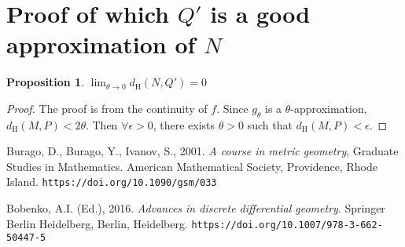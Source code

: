 \documentclass{article}
\newtheorem{proposition}{Proposition}
\begin{document}
\section{Proof of which $Q'$ is a good approximation of $N$}

\begin{proposition}
  $\lim_{\theta \to 0} d_{\text{H}}(N, Q') = 0$
\end{proposition}

\begin{proof}
  The proof is from the continuity of $f$.
  Since $g_\theta$ is a $\theta$-approximation, $d_{\text{H}}(M, P) < 2\theta$. Then $\forall \epsilon > 0$, there exists $\theta > 0$ such that $d_{\text{H}}(M, P) < \epsilon$.
\end{proof}

\begin{thebibliography}{9}
  Burago, D., Burago, Y., Ivanov, S., 2001.
  \textit{A course in metric geometry}, Graduate Studies in Mathematics.
  American Mathematical Society, Providence, Rhode Island.
  \texttt{https://doi.org/10.1090/gsm/033}


  Bobenko, A.I. (Ed.), 2016.
  \textit{Advances in discrete differential geometry}.
  Springer Berlin Heidelberg, Berlin, Heidelberg.
  \texttt{https://doi.org/10.1007/978-3-662-50447-5}

\end{thebibliography}
\end{document}
